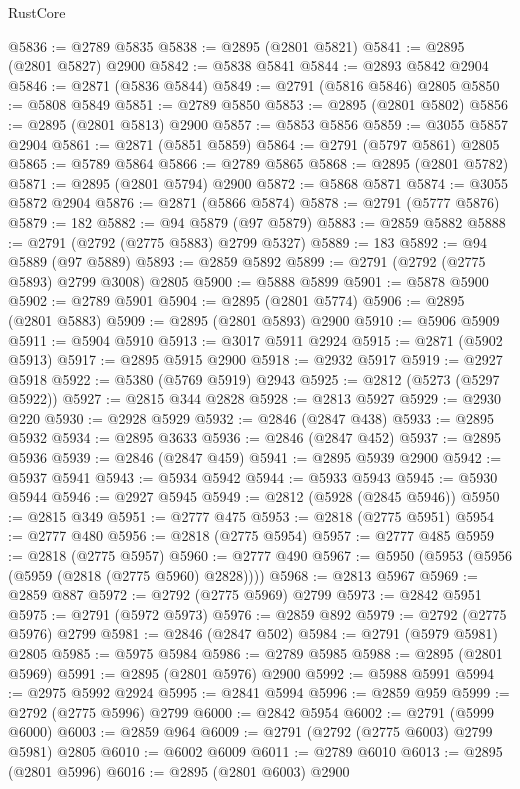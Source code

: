 \begin{lexlean}{RustCore}
\begin{coremodule}
@5836 := @2789 @5835
@5838 := @2895 (@2801 @5821)
@5841 := @2895 (@2801 @5827) @2900
@5842 := @5838 @5841
@5844 := @2893 @5842 @2904
@5846 := @2871 (@5836 @5844)
@5849 := @2791 (@5816 @5846) @2805
@5850 := @5808 @5849
@5851 := @2789 @5850
@5853 := @2895 (@2801 @5802)
@5856 := @2895 (@2801 @5813) @2900
@5857 := @5853 @5856
@5859 := @3055 @5857 @2904
@5861 := @2871 (@5851 @5859)
@5864 := @2791 (@5797 @5861) @2805
@5865 := @5789 @5864
@5866 := @2789 @5865
@5868 := @2895 (@2801 @5782)
@5871 := @2895 (@2801 @5794) @2900
@5872 := @5868 @5871
@5874 := @3055 @5872 @2904
@5876 := @2871 (@5866 @5874)
@5878 := @2791 (@5777 @5876)
@5879 := 182
@5882 := @94 @5879 (@97 @5879)
@5883 := @2859 @5882
@5888 := @2791 (@2792 (@2775 @5883) @2799 @5327)
@5889 := 183
@5892 := @94 @5889 (@97 @5889)
@5893 := @2859 @5892
@5899 := @2791 (@2792 (@2775 @5893) @2799 @3008) @2805
@5900 := @5888 @5899
@5901 := @5878 @5900
@5902 := @2789 @5901
@5904 := @2895 (@2801 @5774)
@5906 := @2895 (@2801 @5883)
@5909 := @2895 (@2801 @5893) @2900
@5910 := @5906 @5909
@5911 := @5904 @5910
@5913 := @3017 @5911 @2924
@5915 := @2871 (@5902 @5913)
@5917 := @2895 @5915 @2900
@5918 := @2932 @5917
@5919 := @2927 @5918
@5922 := @5380 (@5769 @5919) @2943
@5925 := @2812 (@5273 (@5297 @5922))
@5927 := @2815 @344 @2828
@5928 := @2813 @5927
@5929 := @2930 @220
@5930 := @2928 @5929
@5932 := @2846 (@2847 @438)
@5933 := @2895 @5932
@5934 := @2895 @3633
@5936 := @2846 (@2847 @452)
@5937 := @2895 @5936
@5939 := @2846 (@2847 @459)
@5941 := @2895 @5939 @2900
@5942 := @5937 @5941
@5943 := @5934 @5942
@5944 := @5933 @5943
@5945 := @5930 @5944
@5946 := @2927 @5945
@5949 := @2812 (@5928 (@2845 @5946))
@5950 := @2815 @349
@5951 := @2777 @475
@5953 := @2818 (@2775 @5951)
@5954 := @2777 @480
@5956 := @2818 (@2775 @5954)
@5957 := @2777 @485
@5959 := @2818 (@2775 @5957)
@5960 := @2777 @490
@5967 := @5950 (@5953 (@5956 (@5959 (@2818 (@2775 @5960) @2828))))
@5968 := @2813 @5967
@5969 := @2859 @887
@5972 := @2792 (@2775 @5969) @2799
@5973 := @2842 @5951
@5975 := @2791 (@5972 @5973)
@5976 := @2859 @892
@5979 := @2792 (@2775 @5976) @2799
@5981 := @2846 (@2847 @502)
@5984 := @2791 (@5979 @5981) @2805
@5985 := @5975 @5984
@5986 := @2789 @5985
@5988 := @2895 (@2801 @5969)
@5991 := @2895 (@2801 @5976) @2900
@5992 := @5988 @5991
@5994 := @2975 @5992 @2924
@5995 := @2841 @5994
@5996 := @2859 @959
@5999 := @2792 (@2775 @5996) @2799
@6000 := @2842 @5954
@6002 := @2791 (@5999 @6000)
@6003 := @2859 @964
@6009 := @2791 (@2792 (@2775 @6003) @2799 @5981) @2805
@6010 := @6002 @6009
@6011 := @2789 @6010
@6013 := @2895 (@2801 @5996)
@6016 := @2895 (@2801 @6003) @2900

\end{coremodule}
\end{lexlean}
